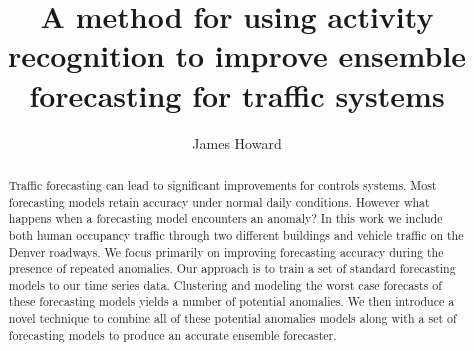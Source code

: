 \documentclass[letterpaper,12pt]{article}
\title{A method for using activity recognition to improve ensemble forecasting for traffic systems}
\author{James Howard}
\begin{document}
\frontmatter

\maketitle
\newpage

\makecopyright{\the\year}
\newpage


\makesubmittal
\newpage

\begin{abstract}
Traffic forecasting can lead to significant improvements for controls systems.  Most forecasting models retain accuracy under normal daily conditions.  However what happens when a forecasting model encounters an anomaly?  In this work we include both human occupancy traffic through two different buildings and vehicle traffic on the Denver roadways.  We focus primarily on improving forecasting accuracy during the presence of repeated anomalies.  Our approach is to train a set of standard forecasting models to our time series data.  Clustering and modeling the worst case forecasts of these forecasting models yields a number of potential anomalies.  We then introduce a novel technique to combine all of these potential anomalies models along with a set of forecasting models to produce an accurate ensemble forecaster.
\end{abstract}

\newpage


\tableofcontents
\newpage


\listoffiguresandtables
\newpage


\newpage

\listofabbreviations*
\newpage

\end{document}
